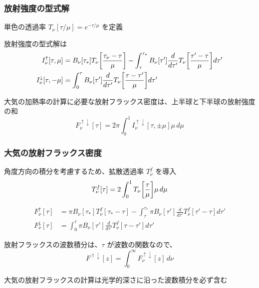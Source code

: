 \documentclass[unicode,colorlinks]{beamer}
\begin{document}
\begin{frame}
	\frametitle{放射強度の型式解}
	単色の透過率 $T_\nu[\tau/\mu]=e^{-\tau/\mu}$ を定義

	放射強度の型式解は
	\begin{align*}
		I^\uparrow_\nu[\tau,\mu]
			&=B_\nu[\tau_*]T_\nu\mleft[\frac{\tau_\nu-\tau}{\mu}\mright]
			-\int^{\tau_*}_\tau B_\nu[\tau']\frac{d}{d\tau'}T_\nu\mleft[\frac{\tau'-\tau}{\mu}\mright]d\tau'\\
		I^\downarrow_\nu[\tau,-\mu]
			&=\int^\tau_0 B_\nu[\tau']\frac{d}{d\tau'}T_\nu\mleft[\frac{\tau-\tau'}{\mu}\mright]d\tau'
	\end{align*}

	大気の加熱率の計算に必要な放射フラックス密度は、上半球と下半球の放射強度の和
	\[F^{\uparrow\downarrow}_\nu[\tau]=2\pi\int^1_0 I^{\uparrow\downarrow}_\nu[\tau,\pm\mu]\mu\,d\mu\]
\end{frame}

\begin{frame}
	\frametitle{大気の放射フラックス密度}
	角度方向の積分を考慮するため、拡散透過率 $T^f_\nu$ を導入
	\[T^f_\nu[\tau]=2\int^1_0 T_\nu\mleft[\frac{\tau}{\mu}\mright]\mu\,d\mu\]

	\begin{align*}
		F^\uparrow_\nu[\tau]
			&=\pi B_\nu[\tau_*]T^f_\nu[\tau_*-\tau]
			-\int^{\tau_*}_\tau \pi B_\nu[\tau']\frac{d}{d\tau'}T^f_\nu[\tau'-\tau]d\tau'\\
		F^\downarrow_\nu[\tau]
			&=\int^\tau_0 \pi B_\nu[\tau']\frac{d}{d\tau'}T^f_\nu[\tau-\tau']d\tau'
	\end{align*}

	放射フラックスの波数積分は、$\tau$ が波数の関数なので、
	\[F^{\uparrow\downarrow}[z]=\int^\infty_0 F^{\uparrow\downarrow}_\nu[z]\,d\nu\]

	大気の放射フラックスの計算は光学的深さに沿った波数積分を必ず含む

\end{frame}
\end{document}
